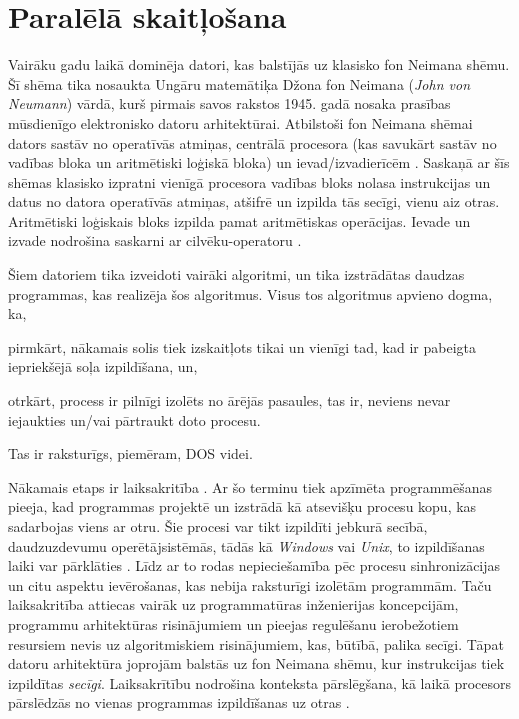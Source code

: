 
\section{Paralēlā skaitļošana}
Vairāku gadu laikā dominēja datori, kas balstījās uz klasisko fon Neimana shēmu. Šī shēma
tika nosaukta Ungāru matemātiķa Džona fon Neimana (\emph{John von Neumann}) vārdā, kurš
pirmais savos rakstos 1945. gadā nosaka prasības mūsdienīgo elektronisko datoru arhitektūrai.
Atbilstoši fon Neimana shēmai dators sastāv no operatīvās atmiņas, centrālā procesora (kas
savukārt sastāv no vadības bloka un aritmētiski loģiskā bloka) un ievad/izvadierīcēm .
Saskaņā ar šīs shēmas klasisko izpratni vienīgā procesora vadības bloks nolasa instrukcijas un
datus no datora operatīvās atmiņas, atšifrē un izpilda tās secīgi, vienu aiz otras. Aritmētiski
loģiskais bloks izpilda pamat aritmētiskas operācijas. Ievade un izvade nodrošina saskarni
ar cilvēku-operatoru \cite{IntParComp}.

Šiem datoriem tika izveidoti vairāki algoritmi, un tika izstrādātas daudzas programmas, kas
realizēja šos algoritmus. Visus tos algoritmus apvieno dogma, ka,
\begin{dotlist}
	\item pirmkārt, nākamais solis tiek izskaitļots tikai un vienīgi tad, kad ir pabeigta
		iepriekšējā soļa izpildīšana, un,
	\item otrkārt, process ir pilnīgi izolēts no ārējās pasaules, tas ir, neviens nevar
		iejaukties un/vai pārtraukt doto procesu.
\end{dotlist}
Tas ir raksturīgs, piemēram, DOS videi.

Nākamais etaps ir laiksakritība . Ar šo terminu tiek apzīmēta programmēšanas
pieeja, kad programmas projektē un izstrādā kā atsevišķu procesu kopu, kas sadarbojas viens
ar otru. Šie procesi var tikt izpildīti jebkurā secībā, daudzuzdevumu operētājsistēmās, tādās
kā \emph{Windows} vai \emph{Unix}, to izpildīšanas laiki var pārklāties \cite{TerminiConcurrency, ConcVsParall}.
Līdz ar to rodas nepieciešamība pēc procesu sinhronizācijas un citu aspektu ievērošanas, kas
nebija raksturīgi izolētām programmām. Taču laiksakritība attiecas vairāk uz programmatūras
inženierijas koncepcijām, programmu arhitektūras risinājumiem un pieejas regulēšanu ierobežotiem
resursiem nevis uz algoritmiskiem risinājumiem, kas, būtībā, palika secīgi. Tāpat datoru
arhitektūra joprojām balstās uz fon Neimana shēmu, kur instrukcijas tiek izpildītas \emph{secīgi}.
Laiksakrītību nodrošina konteksta pārslēgšana, kā laikā procesors pārslēdzās no vienas programmas
izpildīšanas uz otras \cite{OSC}.

